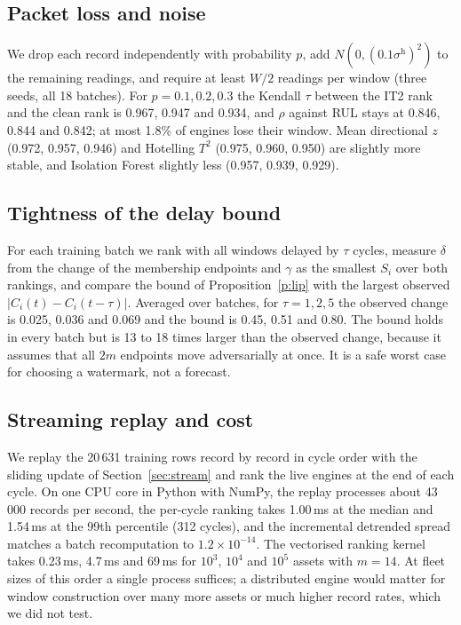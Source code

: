\documentclass[journal,10pt,twocolumn]{IEEEtran}
\begin{document}
\subsection{Packet loss and noise}
We drop each record independently with probability $p$, add $N(0,(0.1\sigma^{\mathrm h})^2)$ to the remaining readings, and require at least $W/2$ readings per window (three seeds, all 18 batches). For $p=0.1,0.2,0.3$ the Kendall $\tau$ between the IT2 rank and the clean rank is 0.967, 0.947 and 0.934, and $\rho$ against RUL stays at 0.846, 0.844 and 0.842; at most 1.8\% of engines lose their window. Mean directional $z$ (0.972, 0.957, 0.946) and Hotelling $T^2$ (0.975, 0.960, 0.950) are slightly more stable, and Isolation Forest slightly less (0.957, 0.939, 0.929).

\subsection{Tightness of the delay bound}
\label{sec:delay}
For each training batch we rank with all windows delayed by $\tau$ cycles, measure $\delta$ from the change of the membership endpoints and $\gamma$ as the smallest $S_i$ over both rankings, and compare the bound of Proposition~\ref{p:lip} with the largest observed $|C_i(t)-C_i(t-\tau)|$. Averaged over batches, for $\tau=1,2,5$ the observed change is 0.025, 0.036 and 0.069 and the bound is 0.45, 0.51 and 0.80. The bound holds in every batch but is 13 to 18 times larger than the observed change, because it assumes that all $2m$ endpoints move adversarially at once. It is a safe worst case for choosing a watermark, not a forecast.

\subsection{Streaming replay and cost}
We replay the 20\,631 training rows record by record in cycle order with the sliding update of Section~\ref{sec:stream} and rank the live engines at the end of each cycle. On one CPU core in Python with NumPy, the replay processes about 43\,000 records per second, the per-cycle ranking takes 1.00\,ms at the median and 1.54\,ms at the 99th percentile (312 cycles), and the incremental detrended spread matches a batch recomputation to $1.2\times10^{-14}$. The vectorised ranking kernel takes 0.23\,ms, 4.7\,ms and 69\,ms for $10^3$, $10^4$ and $10^5$ assets with $m=14$. At fleet sizes of this order a single process suffices; a distributed engine would matter for window construction over many more assets or much higher record rates, which we did not test.
\end{document}
